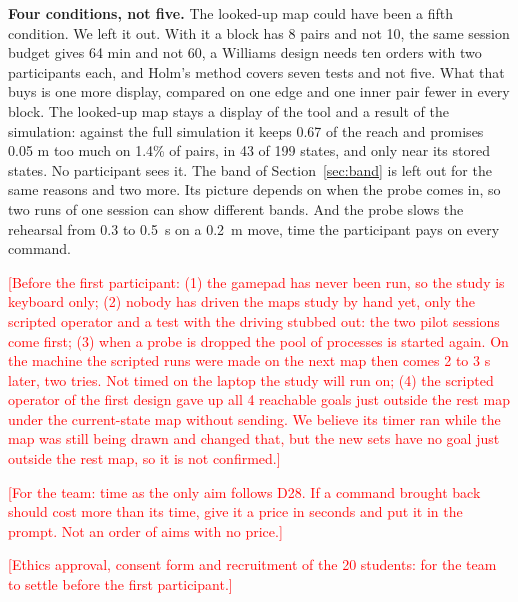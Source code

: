 \documentclass[pdflatex,sn-mathphys-num]{sn-jnl}
\newcommand{\todo}[1]{\textcolor{red}{[#1]}}
\begin{document}
\textbf{Four conditions, not five.} The looked-up map could have been a fifth condition. We left it out. With it
a block has 8 pairs and not 10, the same session budget gives 64 min and not 60, a Williams design needs ten
orders with two participants each, and Holm's method covers seven tests and not five. What that buys is one more
display, compared on one edge and one inner pair fewer in every block. The looked-up map stays a display of the
tool and a result of the simulation: against the full simulation it keeps 0.67 of the reach and promises 0.05 m
too much on 1.4\% of pairs, in 43 of 199 states, and only near its stored states. %
No participant sees it.
The band of Section~\ref{sec:band} is left out for the same reasons and two more. Its picture depends on when the
probe comes in, so two runs of one session can show different bands. And the probe slows the rehearsal from 0.3 to
0.5~s on a 0.2~m move, time the participant pays on every command. %

\todo{Before the first participant: (1) the gamepad has never been run, so the study is keyboard only; (2) nobody
has driven the maps study by hand yet, only the scripted operator and a test with the driving stubbed out: the two
pilot sessions come first; (3) when a probe is dropped the pool of processes is started again. On the machine the scripted runs were made
on the next map then comes 2 to 3 s later, two tries. Not timed on the laptop the study will run on; (4) the scripted operator of the first design gave up all 4 reachable
goals just outside the rest map under the current-state map without sending. We believe its timer ran while the
map was still being drawn and changed that, but the new sets have no goal just outside the rest map, so it is not
confirmed.}

\todo{For the team: time as the only aim follows D28. If a command brought back should cost more than its time,
give it a price in seconds and put it in the prompt. Not an order of aims with no price.}

\todo{Ethics approval, consent form and recruitment of the 20 students: for the team to settle before the
first participant.}
\end{document}
